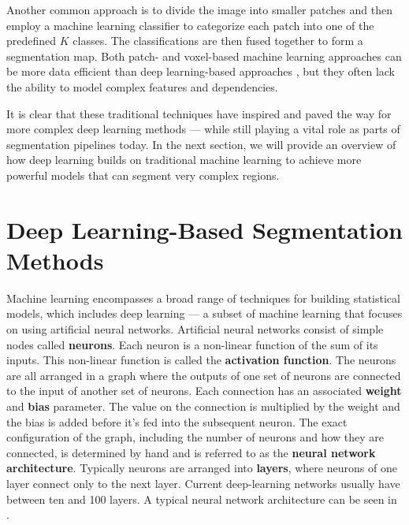 Another common approach is to divide the image into smaller patches and then employ a machine learning classifier to categorize each patch into one of the predefined $K$ classes. The classifications are then fused together to form a segmentation map. Both patch- and voxel-based machine learning approaches can be more data efficient than deep learning-based approaches \cite{bencevicRecentProgressEpicardial2022}, but they often lack the ability to model complex features and dependencies. 

It is clear that these traditional techniques have inspired and paved the way for more complex deep learning methods --- while still playing a vital role as parts of segmentation pipelines today. In the next section, we will provide an overview of how deep learning builds on traditional machine learning to achieve more powerful models that can segment very complex regions.

\pagebreak

\section{Deep Learning-Based Segmentation Methods}

Machine learning encompasses a broad range of techniques for building statistical models, which includes deep learning --- a subset of machine learning that focuses on using artificial neural networks. Artificial neural networks consist of simple nodes called \textbf{neurons}. Each neuron is a non-linear function of the sum of its inputs. This non-linear function is called the \textbf{activation function}. The neurons are all arranged in a graph where the outputs of one set of neurons are connected to the input of another set of neurons. Each connection has an associated \textbf{weight} and \textbf{bias} parameter. The value on the connection is multiplied by the weight and the bias is added before it's fed into the subsequent neuron. The exact configuration of the graph, including the number of neurons and how they are connected, is determined by hand and is referred to as the \textbf{neural network architecture}. Typically neurons are arranged into \textbf{layers}, where neurons of one layer connect only to the next layer. Current deep-learning networks usually have between ten and 100 layers. A typical neural network architecture can be seen in .

